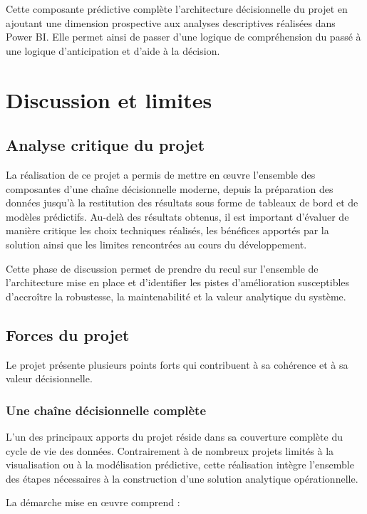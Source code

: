 \documentclass[12pt,a4paper,twoside]{report}
\begin{document}
Cette composante prédictive complète l'architecture décisionnelle du projet en ajoutant une dimension prospective aux analyses descriptives réalisées dans Power BI. Elle permet ainsi de passer d'une logique de compréhension du passé à une logique d'anticipation et d'aide à la décision.

\chapter{Discussion et limites}

\section{Analyse critique du projet}

La réalisation de ce projet a permis de mettre en œuvre l'ensemble des composantes d'une chaîne décisionnelle moderne, depuis la préparation des données jusqu'à la restitution des résultats sous forme de tableaux de bord et de modèles prédictifs. Au-delà des résultats obtenus, il est important d'évaluer de manière critique les choix techniques réalisés, les bénéfices apportés par la solution ainsi que les limites rencontrées au cours du développement.

Cette phase de discussion permet de prendre du recul sur l'ensemble de l'architecture mise en place et d'identifier les pistes d'amélioration susceptibles d'accroître la robustesse, la maintenabilité et la valeur analytique du système.

\section{Forces du projet}

Le projet présente plusieurs points forts qui contribuent à sa cohérence et à sa valeur décisionnelle.

\subsection{Une chaîne décisionnelle complète}

L'un des principaux apports du projet réside dans sa couverture complète du cycle de vie des données. Contrairement à de nombreux projets limités à la visualisation ou à la modélisation prédictive, cette réalisation intègre l'ensemble des étapes nécessaires à la construction d'une solution analytique opérationnelle.

La démarche mise en œuvre comprend :
\end{document}
